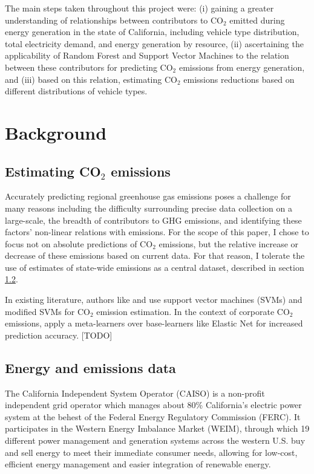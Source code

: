 \documentclass{article}
\begin{document}
The main steps taken throughout this project were: (i) gaining a greater understanding of relationships between contributors to CO\(_2\) emitted during energy generation in the state of California, including vehicle type distribution, total electricity demand, and energy generation by resource, (ii) ascertaining the applicability of Random Forest and Support Vector Machines to the relation between these contributors for predicting CO\(_2\) emissions from energy generation, and (iii) based on this relation, estimating CO\(_2\) emissions reductions based on different distributions of vehicle types.

\section{Background}
\subsection{Estimating CO\(_2\) emissions}
Accurately predicting regional greenhouse gas emissions poses a challenge for many reasons including the difficulty surrounding precise data collection on a large-scale, the breadth of contributors to GHG emissions, and identifying these factors' non-linear relations with emissions. For the scope of this paper, I chose to focus not on absolute predictions of CO\(_2\) emissions, but the relative increase or decrease of these emissions based on current data. For that reason, I tolerate the use of estimates of state-wide emissions as a central dataset, described in section \ref{energyemissionsdata}.

In existing literature, authors like \cite{saleh:co2svm} and \cite{ehteram:co2svm} use support vector machines (SVMs) and modified SVMs for CO\(_2\) emission estimation. In the context of corporate CO\(_2\) emissions, \cite{nguyen:co2prediction} apply a meta-learners over base-learners like Elastic Net for increased prediction accuracy.
[TODO]


\subsection{Energy and emissions data} \label{energyemissionsdata}
The California Independent System Operator (CAISO) is a non-profit independent grid operator which manages about 80\% California's electric power system at the behest of the  Federal Energy Regulatory Commission (FERC). \citep{caiso:bg} It participates in the Western Energy Imbalance Market (WEIM), through which 19 different power management and generation systems across the western U.S. buy and sell energy to meet their immediate consumer needs, allowing for low-cost, efficient energy management and easier integration of renewable energy. \citep{weim:bg}
\end{document}
